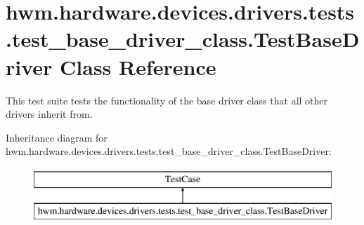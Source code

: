 \hypertarget{classhwm_1_1hardware_1_1devices_1_1drivers_1_1tests_1_1test__base__driver__class_1_1_test_base_driver}{\section{hwm.\-hardware.\-devices.\-drivers.\-tests.\-test\-\_\-base\-\_\-driver\-\_\-class.\-Test\-Base\-Driver Class Reference}
\label{classhwm_1_1hardware_1_1devices_1_1drivers_1_1tests_1_1test__base__driver__class_1_1_test_base_driver}
}


This test suite tests the functionality of the base driver class that all other drivers inherit from.  


Inheritance diagram for hwm.\-hardware.\-devices.\-drivers.\-tests.\-test\-\_\-base\-\_\-driver\-\_\-class.\-Test\-Base\-Driver\-:\begin{figure}[H]
\begin{center}
\leavevmode
\includegraphics[height=2.000000cm]{classhwm_1_1hardware_1_1devices_1_1drivers_1_1tests_1_1test__base__driver__class_1_1_test_base_driver}
\end{center}
\end{figure}
